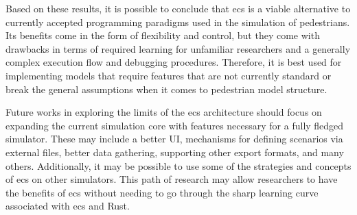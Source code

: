 \documentclass[twoside, 11pt]{article}
\begin{document}
Based on these results, it is possible to conclude that \gls{ecs} is a viable alternative to currently accepted programming paradigms used in the simulation of pedestrians. Its benefits come in the form of flexibility and control, but they come with drawbacks in terms of required learning for unfamiliar researchers and a generally complex execution flow and debugging procedures. Therefore, it is best used for implementing models that require features that are not currently standard or break the general assumptions when it comes to pedestrian model structure.

Future works in exploring the limits of the \gls{ecs} architecture should focus on expanding the current simulation core with features necessary for a fully fledged simulator. These may include a better UI, mechanisms for defining scenarios via external files, better data gathering, supporting other export formats, and many others. Additionally, it may be possible to use some of the strategies and concepts of \gls{ecs} on other simulators. This path of research may allow researchers to have the benefits of \gls{ecs} without needing to go through the sharp learning curve associated with \gls{ecs} and Rust.

\printbibliography
\end{document}
